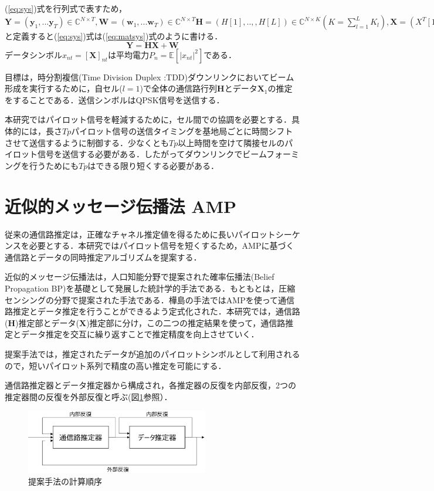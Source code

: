 \documentclass{jarticle}
\begin{document}
(\ref{eq:sys})式を行列式で表すため，$\boldsymbol{Y}=(\boldsymbol{y}_{1},...\boldsymbol{y}_{T})\in\mathbb{C}^{N\times T},\boldsymbol{W}=(\boldsymbol{w}_{1},...\boldsymbol{w}_{T})\in\mathbb{C}^{N\times T}\boldsymbol{H}=(H[1],..,,H[L])\in\mathbb{C}^{N\times K}(K=\sum_{l=1}^{L}K_l),\boldsymbol{X}=(X^{T}[1],...,X^{T}[L])^T\in\mathbb{C}^{K\times T}$と定義すると(\ref{eq:sys})式は(\ref{eq:matsys})式のように書ける．
\begin{equation}
    \label{eq:matsys}
    \boldsymbol{Y} = \boldsymbol{HX+W}
\end{equation}
データシンボル$x_{nt} = [\boldsymbol{X}]_{nt}$は平均電力$P_{n}=\mathbb{E}[|x_{nt}|^{2}]$である．

目標は，時分割複信(Time Division Duplex :TDD)ダウンリンクにおいてビーム形成を実行するために，自セル($l=1$)で全体の通信路行列$\boldsymbol{H}$とデータ$\boldsymbol{X}_1$の推定をすることである．送信シンボルはQPSK信号を送信する．

本研究ではパイロット信号を軽減するために，セル間での協調を必要とする．具体的には，長さ$Tp$パイロット信号の送信タイミングを基地局ごとに時間シフトさせて送信するように制御する．少なくとも$Tp$以上時間を空けて隣接セルのパイロット信号を送信する必要がある．したがってダウンリンクでビームフォーミングを行うためにも$Tp$はできる限り短くする必要がある．

\section{近似的メッセージ伝播法 AMP}
従来の通信路推定は，正確なチャネル推定値を得るために長いパイロットシーケンスを必要とする．本研究ではパイロット信号を短くするため，AMPに基づく通信路とデータの同時推定アルゴリズムを提案する．

近似的メッセージ伝播法は，人口知能分野で提案された確率伝播法(Belief Propagation BP)を基礎として発展した統計学的手法である．もともとは，圧縮センシングの分野で提案された手法である\cite{Donoho}．樺島の手法ではAMPを使って通信路推定とデータ推定を行うことができるよう定式化された\cite{kabashima}．本研究では，通信路($\boldsymbol{H}$)推定部とデータ($\boldsymbol{X}$)推定部に分け，この二つの推定結果を使って，通信路推定とデータ推定を交互に繰り返すことで推定精度を向上させていく．

提案手法では，推定されたデータが追加のパイロットシンボルとして利用されるので，短いパイロット系列で精度の高い推定を可能にする．

通信路推定器とデータ推定器から構成され，各推定器の反復を内部反復，2つの推定器間の反復を外部反復と呼ぶ(図\ref{fig:flow}参照）．
\begin{figure}[htbp]
    \begin{center}
     \includegraphics[width=80mm]{./flow.eps}
    \end{center}
    \caption{提案手法の計算順序}
    \label{fig:flow}
\end{figure}
\end{document}
